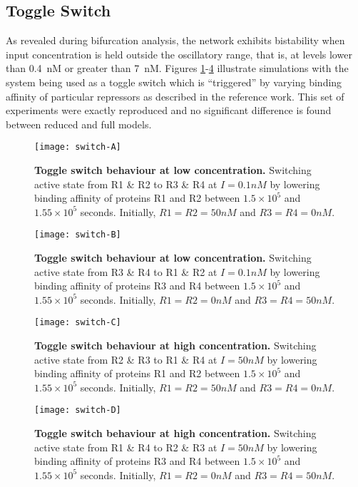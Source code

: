   \subsection{Toggle Switch}

    As revealed during bifurcation analysis, the network exhibits bistability when input concentration is held outside the oscillatory range, that is, at levels lower than \SI{0.4}{\nano M} or greater than \SI{7}{\nano M}.
    Figures \ref{fig:switch-A}-\ref{fig:switch-D} illustrate simulations with the system being used as a toggle switch which is ``triggered'' by varying binding affinity of particular repressors as described in the reference work.
    This set of experiments were exactly reproduced and no significant difference is found between reduced and full models.

    \begin{figure}[!htb]
      \centering
      \texttt{[image: switch-A]}
      \caption{\textbf{Toggle switch behaviour at low concentration.} Switching active state from R1 \& R2 to R3 \& R4 at $I = 0.1 nM$ by lowering binding affinity of proteins R1 and R2 between $1.5 \times 10^5$ and $1.55 \times 10^5$ seconds. Initially, $R1 = R2 = 50nM$ and $R3 = R4 = 0nM$.}
      \label{fig:switch-A}
    \end{figure}
    \begin{figure}[!htb]
      \centering
      \texttt{[image: switch-B]}
      \caption{\textbf{Toggle switch behaviour at low concentration.} Switching active state from R3 \& R4 to R1 \& R2 at $I = 0.1 nM$ by lowering binding affinity of proteins R3 and R4 between $1.5 \times 10^5$ and $1.55 \times 10^5$ seconds. Initially, $R1 = R2 = 0nM$ and $R3 = R4 = 50nM$.}
      \label{fig:switch-B}
    \end{figure}

    \begin{figure}[!htb]
      \centering
      \texttt{[image: switch-C]}
      \caption{\textbf{Toggle switch behaviour at high concentration.} Switching active state from R2 \& R3 to R1 \& R4 at $I = 50 nM$ by lowering binding affinity of proteins R1 and R2 between $1.5 \times 10^5$ and $1.55 \times 10^5$ seconds. Initially, $R1 = R2 = 50nM$ and $R3 = R4 = 0nM$.}
      \label{fig:switch-C}
    \end{figure}
    \begin{figure}[!htb]
      \centering
      \texttt{[image: switch-D]}
      \caption{\textbf{Toggle switch behaviour at high concentration.} Switching active state from R1 \& R4 to R2 \& R3 at $I = 50 nM$ by lowering binding affinity of proteins R3 and R4 between $1.5 \times 10^5$ and $1.55 \times 10^5$ seconds. Initially, $R1 = R2 = 0nM$ and $R3 = R4 = 50nM$.}
      \label{fig:switch-D}
    \end{figure}


